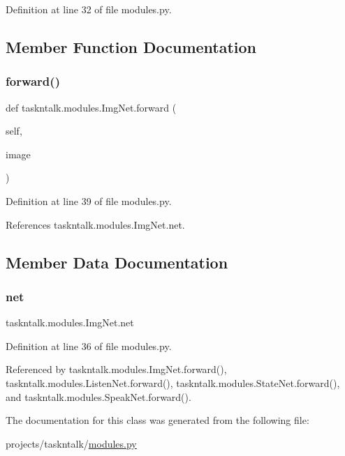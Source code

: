 Definition at line 32 of file modules.\+py.



\subsection{Member Function Documentation}
\mbox{\label{classtaskntalk_1_1modules_1_1ImgNet_a209986185b80feb69f38b57e746f743e}} 
\subsubsection{\texorpdfstring{forward()}{forward()}}
{\footnotesize\ttfamily def taskntalk.\+modules.\+Img\+Net.\+forward (\begin{DoxyParamCaption}\item[{}]{self,  }\item[{}]{image }\end{DoxyParamCaption})}



Definition at line 39 of file modules.\+py.



References taskntalk.\+modules.\+Img\+Net.\+net.



\subsection{Member Data Documentation}
\mbox{\label{classtaskntalk_1_1modules_1_1ImgNet_a63c85b15e7d87f6c08e790c7cbeb4ef7}} 
\subsubsection{\texorpdfstring{net}{net}}
{\footnotesize\ttfamily taskntalk.\+modules.\+Img\+Net.\+net}



Definition at line 36 of file modules.\+py.



Referenced by taskntalk.\+modules.\+Img\+Net.\+forward(), taskntalk.\+modules.\+Listen\+Net.\+forward(), taskntalk.\+modules.\+State\+Net.\+forward(), and taskntalk.\+modules.\+Speak\+Net.\+forward().



The documentation for this class was generated from the following file\+:\begin{DoxyCompactItemize}
\item 
projects/taskntalk/\hyperlink{projects_2taskntalk_2modules_8py}{modules.\+py}\end{DoxyCompactItemize}
